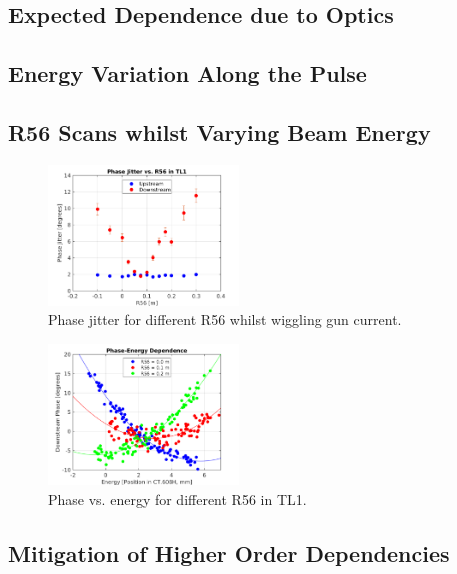 
\subsection{Expected Dependence due to Optics}
\label{ss:t566Sim}

\subsection{Energy Variation Along the Pulse}
\label{ss:energyAlongPulse}

\subsection{R56 Scans whilst Varying Beam Energy}
\label{ss:r56ScanWithEnergy}

\begin{figure}
  \centering
  \includegraphics[width=0.45\textwidth]{Figures/R56ScanGunWiggle_PhaseJitter}
  \caption{Phase jitter for different R56 whilst wiggling gun current.}
  \label{f:R56ScanGunWiggle_PhaseJitter}
\end{figure}

\begin{figure}
  \centering
  \includegraphics[width=0.45\textwidth]{Figures/R56ScanGunWiggle_Vs608}
  \caption{Phase vs. energy for different R56 in TL1.}
  \label{f:R56ScanGunWiggle_Vs608}
\end{figure}

\subsection{Mitigation of Higher Order Dependencies}
\label{ss:t566Mitigation}



